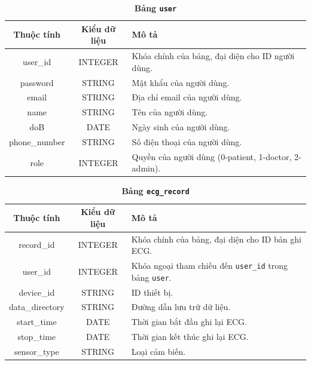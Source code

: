 \documentclass{article}%
\begin{document}
\begin{table}[H]
  \caption{\bfseries \fontsize{12pt}{0pt}\selectfont Bảng \texttt{user}}
  \centering
  \begin{tabularx}{0.9\textwidth}{|c|c|X|}
    \hline
    \textbf{Thuộc tính} & \textbf{Kiểu dữ liệu} & \textbf{Mô tả} \\
    \hline
    user\_id & INTEGER & Khóa chính của bảng, đại diện cho ID người dùng. \\
    \hline
    password & STRING & Mật khẩu của người dùng. \\
    \hline
    email & STRING & Địa chỉ email của người dùng. \\
    \hline
    name & STRING & Tên của người dùng. \\
    \hline
    doB & DATE & Ngày sinh của người dùng. \\
    \hline
    phone\_number & STRING & Số điện thoại của người dùng. \\
    \hline
    role & INTEGER & Quyền của người dùng (0-patient, 1-doctor, 2-admin). \\
    \hline
  \end{tabularx}
\end{table}

\begin{table}[H]
  \caption{\bfseries \fontsize{12pt}{0pt}\selectfont Bảng \texttt{ecg\_record}}
  \centering
  \begin{tabularx}{0.9\textwidth}{|c|c|X|}
    \hline
    \textbf{Thuộc tính} & \textbf{Kiểu dữ liệu} & \textbf{Mô tả} \\
    \hline
    record\_id & INTEGER & Khóa chính của bảng, đại diện cho ID bản ghi ECG. \\
    \hline
    user\_id & INTEGER & Khóa ngoại tham chiếu đến \texttt{user\_id} trong bảng \texttt{user}. \\
    \hline
    device\_id & STRING & ID thiết bị. \\
    \hline
    data\_directory & STRING & Đường dẫn lưu trữ dữ liệu. \\
    \hline
    start\_time & DATE & Thời gian bắt đầu ghi lại ECG. \\
    \hline
    stop\_time & DATE & Thời gian kết thúc ghi lại ECG. \\
    \hline
    sensor\_type & STRING & Loại cảm biến. \\
    \hline
  \end{tabularx}
\end{table}
\end{document}
